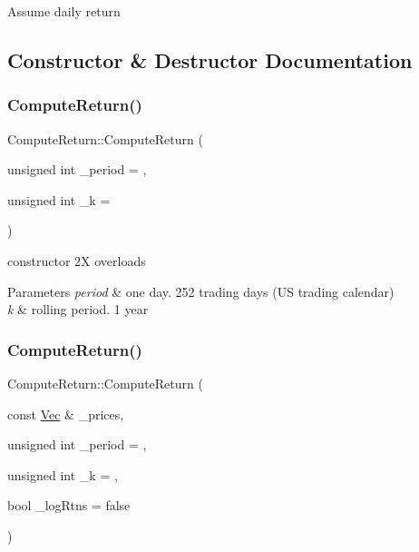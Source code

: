 Assume daily return 

\subsection{Constructor \& Destructor Documentation}
\hypertarget{classComputeReturn_a5ddfc65ef8a500beffff33cc3f416271}{}\label{classComputeReturn_a5ddfc65ef8a500beffff33cc3f416271} 
\subsubsection{\texorpdfstring{Compute\+Return()}{ComputeReturn()}\hspace{0.1cm}{\footnotesize\ttfamily [1/4]}}
{\footnotesize\ttfamily Compute\+Return\+::\+Compute\+Return (\begin{DoxyParamCaption}\item[{unsigned int}]{\+\_\+period = {},  }\item[{unsigned int}]{\+\_\+k = {} }\end{DoxyParamCaption})}

constructor 2X overloads 
\begin{DoxyParams}{Parameters}
{\em period} & one day. 252 trading days (US trading calendar) \\
\hline
{\em k} & rolling period. 1 year \\
\hline
\end{DoxyParams}
\hypertarget{classComputeReturn_a8431159bc745ac489ae4c813bd34e540}{}\label{classComputeReturn_a8431159bc745ac489ae4c813bd34e540} 
\subsubsection{\texorpdfstring{Compute\+Return()}{ComputeReturn()}\hspace{0.1cm}{\footnotesize\ttfamily [2/4]}}
{\footnotesize\ttfamily Compute\+Return\+::\+Compute\+Return (\begin{DoxyParamCaption}\item[{const \hyperlink{compute__returns__eigen_8h_a1eb6a9306ef406d7975f3cbf2e247777}{Vec} \&}]{\+\_\+prices,  }\item[{unsigned int}]{\+\_\+period = {},  }\item[{unsigned int}]{\+\_\+k = {},  }\item[{bool}]{\+\_\+log\+Rtns = {\ttfamily false} }\end{DoxyParamCaption})}

